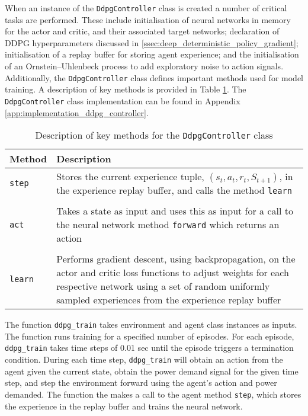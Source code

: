 When an instance of the \verb|DdpgController| class is created a number of critical tasks are performed. These include initialisation of neural networks in memory for the actor and critic, and their associated target networks; declaration of DDPG hyperparameters discussed in \textsection \ref{ssec:deep_deterministic_policy_gradient}; initialisation of a replay buffer for storing agent experience; and the initialisation of an Ornstein–Uhlenbeck process to add exploratory noise to action signals. Additionally, the \verb|DdpgController| class defines important methods used for model training. A description of key methods is provided in Table \ref{tab:4103}. The \verb|DdpgController| class implementation can be found in Appendix \ref{app:implementation_ddpg_controller}.

\begin{table}[h]
	\centering
	\cprotect\caption{Description of key methods for the \verb|DdpgController| class}
	\begin{tabular}{lp{12cm}}
		\toprule
		\textbf{Method} & \textbf{Description} \\
		\midrule
		\verb|step| & Stores the current experience tuple, $(s_t, a_t, r_t, S_{t+1})$, in the experience replay buffer, and calls the method \verb|learn|\\
		 & \\
		\verb|act| & Takes a state as input and uses this as input for a call to the neural network method \verb|forward| which returns an action\\
		 & \\
		\verb|learn| & Performs gradient descent, using backpropagation, on the actor and critic loss functions to adjust weights for each respective network using a set of random uniformly sampled experiences from the experience replay buffer\\
		\bottomrule
	\end{tabular}\label{tab:4103}
\end{table} 

The function \verb|ddpg_train| takes environment and agent class instances as inputs. The function runs training for a specified number of episodes. For each episode, \verb|ddpg_train| takes time steps of 0.01 sec until the episode triggers a termination condition. During each time step, \verb|ddpg_train| will obtain an action from the agent given the current state, obtain the power demand signal for the given time step, and step the environment forward using the agent's action and power demanded. The function the makes a call to the agent method \verb|step|, which stores the experience in the replay buffer and trains the neural network.